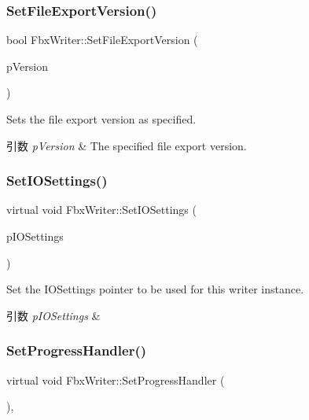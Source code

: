 \subsubsection{\texorpdfstring{Set\+File\+Export\+Version()}{SetFileExportVersion()}}
{\footnotesize\ttfamily bool Fbx\+Writer\+::\+Set\+File\+Export\+Version (\begin{DoxyParamCaption}\item[{\hyperlink{class_fbx_string}{Fbx\+String}}]{p\+Version }\end{DoxyParamCaption})}

Sets the file export version as specified. 
\begin{DoxyParams}{引数}
{\em p\+Version} & The specified file export version. \\
\hline
\end{DoxyParams}
\mbox{\label{class_fbx_writer_acdc632472e0252b6087fd55ef05a7e2a}} 
\subsubsection{\texorpdfstring{Set\+I\+O\+Settings()}{SetIOSettings()}}
{\footnotesize\ttfamily virtual void Fbx\+Writer\+::\+Set\+I\+O\+Settings (\begin{DoxyParamCaption}\item[{\hyperlink{class_fbx_i_o_settings}{Fbx\+I\+O\+Settings} $\ast$}]{p\+I\+O\+Settings }\end{DoxyParamCaption})\hspace{0.3cm}{\ttfamily [virtual]}}

Set the I\+O\+Settings pointer to be used for this writer instance. 
\begin{DoxyParams}{引数}
{\em p\+I\+O\+Settings} & \\
\hline
\end{DoxyParams}
\mbox{\label{class_fbx_writer_a1a3cf241a0c11364981ebd23be59fd8f}} 
\subsubsection{\texorpdfstring{Set\+Progress\+Handler()}{SetProgressHandler()}}
{\footnotesize\ttfamily virtual void Fbx\+Writer\+::\+Set\+Progress\+Handler (\begin{DoxyParamCaption}\item[{\hyperlink{class_fbx_progress}{Fbx\+Progress} $\ast$}]{ }\end{DoxyParamCaption})\hspace{0.3cm}{\ttfamily [inline]}, {\ttfamily [virtual]}}

